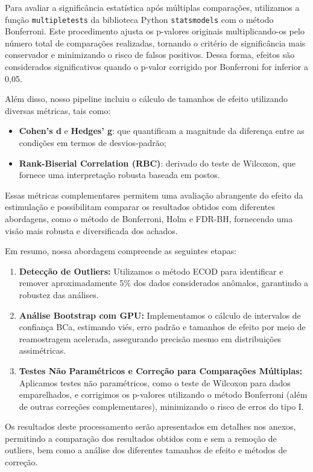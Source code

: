 Para avaliar a significância estatística após múltiplas comparações, utilizamos a função \texttt{multipletests} da biblioteca Python \texttt{statsmodels} com o método Bonferroni. Este procedimento ajusta os p-valores originais multiplicando-os pelo número total de comparações realizadas, tornando o critério de significância mais conservador e minimizando o risco de falsos positivos. Dessa forma, efeitos são considerados significativos quando o p-valor corrigido por Bonferroni for inferior a 0,05.

Além disso, nosso pipeline incluiu o cálculo de tamanhos de efeito utilizando diversas métricas, tais como:
\begin{itemize}
    \item \textbf{Cohen's d} e \textbf{Hedges' g}: que quantificam a magnitude da diferença entre as condições em termos de desvios-padrão;
    \item \textbf{Rank-Biserial Correlation (RBC)}: derivado do teste de Wilcoxon, que fornece uma interpretação robusta baseada em postos.
\end{itemize}

Essas métricas complementares permitem uma avaliação abrangente do efeito da estimulação e possibilitam comparar os resultados obtidos com diferentes abordagens, como o método de Bonferroni, Holm e FDR-BH, fornecendo uma visão mais robusta e diversificada dos achados.

Em resumo, nossa abordagem compreende as seguintes etapas:
\begin{enumerate}
    \item \textbf{Detecção de Outliers:} Utilizamos o método ECOD para identificar e remover aproximadamente 5\% dos dados considerados anômalos, garantindo a robustez das análises.
    \item \textbf{Análise Bootstrap com GPU:} Implementamos o cálculo de intervalos de confiança BCa, estimando viés, erro padrão e tamanhos de efeito por meio de reamostragem acelerada, assegurando precisão mesmo em distribuições assimétricas.
    \item \textbf{Testes Não Paramétricos e Correção para Comparações Múltiplas:} Aplicamos testes não paramétricos, como o teste de Wilcoxon para dados emparelhados, e corrigimos os p-valores utilizando o método Bonferroni (além de outras correções complementares), minimizando o risco de erros do tipo I.
\end{enumerate}

Os resultados deste processamento serão apresentados em detalhes nos anexos, permitindo a comparação dos resultados obtidos com e sem a remoção de outliers, bem como a análise dos diferentes tamanhos de efeito e métodos de correção.

